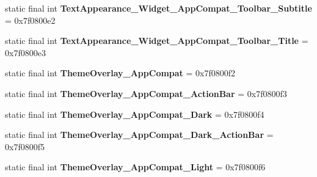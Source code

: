 \begin{DoxyCompactItemize}
\item 
\hypertarget{classandroid_1_1support_1_1v7_1_1appcompat_1_1_r_1_1style_ac0dfcde296d98d6934a405e562bcb03a}{}static final int {\bfseries Text\+Appearance\+\_\+\+Widget\+\_\+\+App\+Compat\+\_\+\+Toolbar\+\_\+\+Subtitle} = 0x7f0800e2\label{classandroid_1_1support_1_1v7_1_1appcompat_1_1_r_1_1style_ac0dfcde296d98d6934a405e562bcb03a}

\item 
\hypertarget{classandroid_1_1support_1_1v7_1_1appcompat_1_1_r_1_1style_a28d5448998ba455f9737b0c596c86e4c}{}static final int {\bfseries Text\+Appearance\+\_\+\+Widget\+\_\+\+App\+Compat\+\_\+\+Toolbar\+\_\+\+Title} = 0x7f0800e3\label{classandroid_1_1support_1_1v7_1_1appcompat_1_1_r_1_1style_a28d5448998ba455f9737b0c596c86e4c}

\item 
\hypertarget{classandroid_1_1support_1_1v7_1_1appcompat_1_1_r_1_1style_a64b85d09de2998a010cefa99b11df028}{}static final int {\bfseries Theme\+Overlay\+\_\+\+App\+Compat} = 0x7f0800f2\label{classandroid_1_1support_1_1v7_1_1appcompat_1_1_r_1_1style_a64b85d09de2998a010cefa99b11df028}

\item 
\hypertarget{classandroid_1_1support_1_1v7_1_1appcompat_1_1_r_1_1style_a082b745b4e2430ec34548fd43dabd3c6}{}static final int {\bfseries Theme\+Overlay\+\_\+\+App\+Compat\+\_\+\+Action\+Bar} = 0x7f0800f3\label{classandroid_1_1support_1_1v7_1_1appcompat_1_1_r_1_1style_a082b745b4e2430ec34548fd43dabd3c6}

\item 
\hypertarget{classandroid_1_1support_1_1v7_1_1appcompat_1_1_r_1_1style_a153bf2a32f53c4a761520ebb9d57ba46}{}static final int {\bfseries Theme\+Overlay\+\_\+\+App\+Compat\+\_\+\+Dark} = 0x7f0800f4\label{classandroid_1_1support_1_1v7_1_1appcompat_1_1_r_1_1style_a153bf2a32f53c4a761520ebb9d57ba46}

\item 
\hypertarget{classandroid_1_1support_1_1v7_1_1appcompat_1_1_r_1_1style_a51b51d13caa660cffc430f496874d8dc}{}static final int {\bfseries Theme\+Overlay\+\_\+\+App\+Compat\+\_\+\+Dark\+\_\+\+Action\+Bar} = 0x7f0800f5\label{classandroid_1_1support_1_1v7_1_1appcompat_1_1_r_1_1style_a51b51d13caa660cffc430f496874d8dc}

\item 
\hypertarget{classandroid_1_1support_1_1v7_1_1appcompat_1_1_r_1_1style_a9aee71f01b9ed4c13fef15dcd60b2316}{}static final int {\bfseries Theme\+Overlay\+\_\+\+App\+Compat\+\_\+\+Light} = 0x7f0800f6\label{classandroid_1_1support_1_1v7_1_1appcompat_1_1_r_1_1style_a9aee71f01b9ed4c13fef15dcd60b2316}


\end{DoxyCompactItemize}
